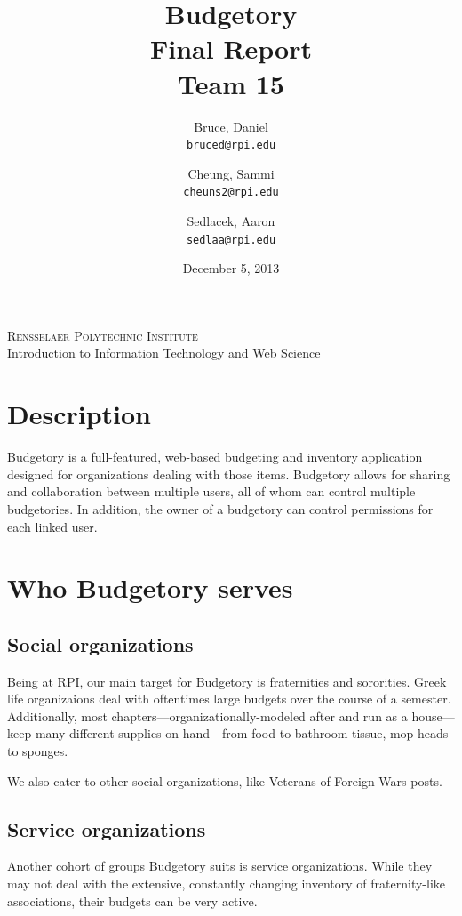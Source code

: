 \documentclass{article}
\title{\Huge{\textsf{Budgetory} \\ Final Report \\ \vspace{35px} \Large{Team 15}}}
\author{
Bruce, Daniel\\
\texttt{bruced@rpi.edu}
\and
Cheung, Sammi\\
\texttt{cheuns2@rpi.edu}
\and
Sedlacek, Aaron\\
\texttt{sedlaa@rpi.edu}
}
\date{\vfill{} \large{December 5, 2013}}
\begin{document}
\begin{center}
\Large{\textsc{Rensselaer Polytechnic Institute} \\ Introduction to Information Technology and Web Science}
\end{center}
{\let\newpage\relax\maketitle}
\thispagestyle{empty}
\newpage


\section{Description}
\textsf{Budgetory} is a full-featured, web-based budgeting and inventory application designed for organizations dealing with those items. \textsf{Budgetory} allows for sharing and collaboration between multiple users, all of whom can control multiple budgetories. In addition, the owner of a budgetory can control permissions for each linked user. 


\vspace{40pt}

\section{Who \textsf{Budgetory} serves}
\vspace{20px}
\subsection{Social organizations}
Being at RPI, our main target for \textsf{Budgetory} is fraternities and sororities. Greek life organizaions deal with oftentimes large budgets over the course of a semester. Additionally, most chapters---organizationally-modeled after and run as a house---keep many different supplies on hand---from food to bathroom tissue, mop heads to sponges. 

We also cater to other social organizations, like Veterans of Foreign Wars posts.
\vspace{20px}
\subsection{Service organizations}
Another cohort of groups \textsf{Budgetory} suits is service organizations. While they may not deal with the extensive, constantly changing inventory of fraternity-like associations, their budgets can be very active.
\end{document}
